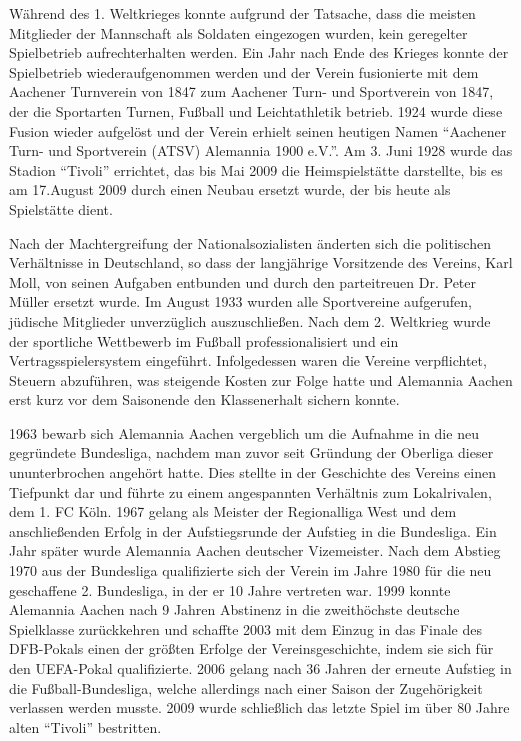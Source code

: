 Während des 1. Weltkrieges konnte aufgrund der Tatsache, dass die meisten Mitglieder der Mannschaft als Soldaten eingezogen wurden, kein geregelter Spielbetrieb aufrechterhalten werden.
Ein Jahr nach Ende des Krieges konnte der Spielbetrieb wiederaufgenommen werden und der Verein fusionierte mit dem Aachener Turnverein von 1847 zum Aachener Turn- und Sportverein von 1847, der die Sportarten Turnen, Fußball und Leichtathletik betrieb.
1924 wurde diese Fusion wieder aufgelöst und der Verein erhielt seinen heutigen Namen "`Aachener Turn- und Sportverein (ATSV) Alemannia 1900 e.V."'.
Am 3. Juni 1928 wurde das Stadion "`Tivoli"' errichtet, das bis Mai 2009 die Heimspielstätte darstellte, bis es am 17.August 2009 durch einen Neubau ersetzt wurde, der bis heute als Spielstätte dient.

Nach der Machtergreifung der Nationalsozialisten änderten sich die politischen Verhältnisse in Deutschland, so dass der langjährige Vorsitzende des Vereins, Karl Moll, von seinen Aufgaben entbunden und durch den parteitreuen Dr. Peter Müller ersetzt wurde.
Im August 1933 wurden alle Sportvereine aufgerufen, jüdische Mitglieder unverzüglich auszuschließen.
Nach dem 2. Weltkrieg wurde der sportliche Wettbewerb im Fußball professionalisiert und ein Vertragsspielersystem eingeführt.
Infolgedessen waren die Vereine verpflichtet, Steuern abzuführen, was steigende Kosten zur Folge hatte und Alemannia Aachen erst kurz vor dem Saisonende den Klassenerhalt sichern konnte.

1963 bewarb sich Alemannia Aachen vergeblich um die Aufnahme in die neu gegründete Bundesliga, nachdem man zuvor seit Gründung der Oberliga dieser ununterbrochen angehört hatte.
Dies stellte in der Geschichte des Vereins einen Tiefpunkt dar und führte zu einem angespannten Verhältnis zum Lokalrivalen, dem 1. FC Köln.
1967 gelang als Meister der Regionalliga West und dem anschließenden Erfolg in der Aufstiegsrunde der Aufstieg in die Bundesliga.
Ein Jahr später wurde Alemannia Aachen deutscher Vizemeister.
Nach dem Abstieg 1970 aus der Bundesliga qualifizierte sich der Verein im Jahre 1980 für die neu geschaffene 2. Bundesliga, in der er 10 Jahre vertreten war.
1999 konnte Alemannia Aachen nach 9 Jahren Abstinenz in die zweithöchste deutsche Spielklasse zurückkehren und schaffte 2003 mit dem Einzug in das Finale des DFB-Pokals einen der größten Erfolge der Vereinsgeschichte, indem sie sich für den UEFA-Pokal qualifizierte.
2006 gelang nach 36 Jahren der erneute Aufstieg in die Fußball-Bundesliga, welche allerdings nach einer Saison der Zugehörigkeit verlassen werden musste.
2009 wurde schließlich das letzte Spiel im über 80 Jahre alten "`Tivoli"' bestritten.

